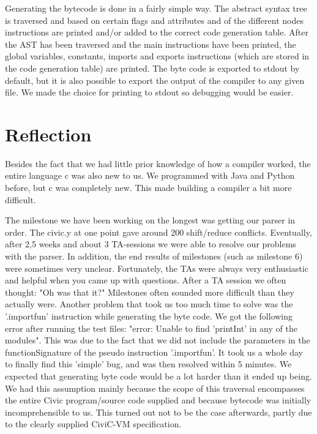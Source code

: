 \documentclass{uva-inf-article}
\begin{document}
\par Generating the bytecode is done in a fairly simple way.
The abstract syntax tree is traversed and based on certain flags and attributes and of the different 
nodes instructions are printed and/or added to the correct code generation table.
After the AST has been traversed and the main instructions have been printed, the global variables, constants, 
imports and exports instructions (which are stored in the code generation table) are printed.
The byte code is exported to stdout by default, but it is also possible to export the output of the compiler to any given file.
We made the choice for printing to stdout so debugging would be easier. 

\section{Reflection}
\par Besides the fact that we had little prior knowledge of how a compiler worked, the entire language c was also new to us.
We programmed with Java and Python before, but c was completely new. This made building a compiler a bit more difficult.

The milestone we have been working on the longest was getting our parser in order.
The civic.y at one point gave around 200 shift/reduce conflicts. Eventually, after 2,5 weeks and about 3 TA-sessions we were able to resolve our problems with the parser.
In addition, the end results of milestones (such as milestone 6) were sometimes very unclear. Fortunately, the TAs were always very enthusiastic and helpful when you came up with questions. 
After a TA session we often thought: "Oh was that it?" Milestones often sounded more difficult than they actually were.
Another problem that took us too much time to solve was the '.importfun' instruction while generating the byte code. 
We got the following error after running the test files: "error: Unable to find 'printInt' in any of the modules". 
This was due to the fact that we did not include the parameters in the functionSignature of the pseudo instruction '.importfun'. 
It took us a whole day to finally find this 'simple' bug, and was then resolved within 5 minutes.
We expected that generating byte code would be a lot harder than it ended up being. 
We had this assumption mainly because the scope of this traversal encompasses the entire Civic program/source code supplied and because bytecode was initially 
incomprehensible to us. This turned out not to be the case afterwards, partly due to the clearly supplied CiviC-VM specification.
\end{document}
